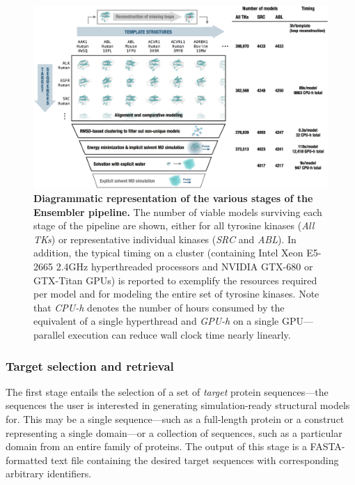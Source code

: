 \documentclass[aps,pre,twocolumn,nofootinbib,superscriptaddress,linenumbers]{revtex4-1}
\begin{document}
\begin{figure}[tb]
    \includegraphics[width=1.0\textwidth]{pipeline/pipeline2}

  \caption{{\bf Diagrammatic representation of the various stages of the Ensembler pipeline.}
  The number of viable models surviving each stage of the pipeline are shown, either for all tyrosine kinases (\emph{All TKs}) or representative individual kinases (\emph{SRC} and \emph{ABL}).
  In addition, the typical timing on a cluster (containing Intel Xeon E5-2665 2.4GHz hyperthreaded processors and NVIDIA GTX-680 or GTX-Titan GPUs) is reported to exemplify the resources required per model and for modeling the entire set of tyrosine kinases.
  Note that \emph{CPU-h} denotes the number of hours consumed by the equivalent of a single hyperthread and \emph{GPU-h} on a single GPU---parallel execution can reduce wall clock time nearly linearly.
  }
  \label{figpipeline}
\end{figure}

\subsubsection*{Target selection and retrieval}

The first stage entails the selection of a set of \emph{target} protein sequences---the sequences the user is interested in generating simulation-ready structural models for.
This may be a single sequence---such as a full-length protein or a construct representing a single domain---or a collection of sequences, such as a particular domain from an entire family of proteins.
The output of this stage is a FASTA-formatted text file containing the desired target sequences with corresponding arbitrary identifiers.
\end{document}
